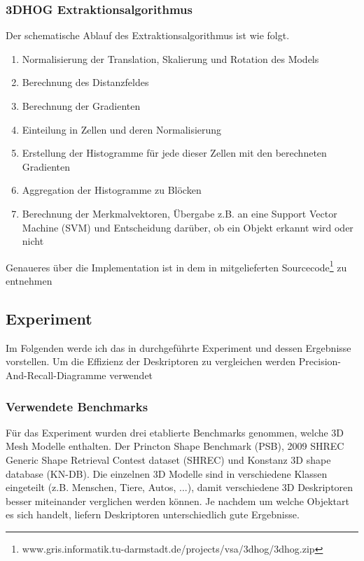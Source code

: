 \subsubsection{3DHOG Extraktionsalgorithmus}
Der schematische Ablauf des Extraktionsalgorithmus ist wie folgt.

\begin{enumerate} 
	\item Normalisierung der Translation, Skalierung und Rotation des Models
	\item Berechnung des Distanzfeldes
	\item Berechnung der Gradienten
	\item Einteilung in Zellen und deren Normalisierung
	\item Erstellung der Histogramme für jede dieser Zellen mit den berechneten Gradienten
	\item Aggregation der Histogramme zu Blöcken
	\item Berechnung der Merkmalvektoren, Übergabe z.B. an eine Support Vector Machine (SVM) und Entscheidung darüber, ob ein Objekt erkannt wird oder nicht
	
\end{enumerate}
Genaueres über die Implementation ist in dem in \cite{scherer2010histograms} mitgelieferten Sourcecode\footnote{www.gris.informatik.tu-darmstadt.de/projects/vsa/3dhog/3dhog.zip} zu entnehmen 

 
\subsection{Experiment}
Im Folgenden werde ich das in \cite{scherer2010histograms} durchgeführte Experiment und dessen Ergebnisse vorstellen. Um die Effizienz der Deskriptoren zu vergleichen werden Precision-And-Recall-Diagramme verwendet

\subsubsection{Verwendete Benchmarks}
Für das Experiment wurden drei etablierte Benchmarks genommen, welche 3D Mesh Modelle enthalten. Der Princton Shape Benchmark (PSB), 2009 SHREC Generic Shape Retrieval Contest dataset (SHREC) und Konstanz 3D shape database (KN-DB). Die einzelnen 3D Modelle sind in verschiedene Klassen eingeteilt (z.B. Menschen, Tiere, Autos, ...), damit verschiedene 3D Deskriptoren besser miteinander verglichen werden können. Je nachdem um welche Objektart es sich handelt, liefern Deskriptoren unterschiedlich gute Ergebnisse. 

